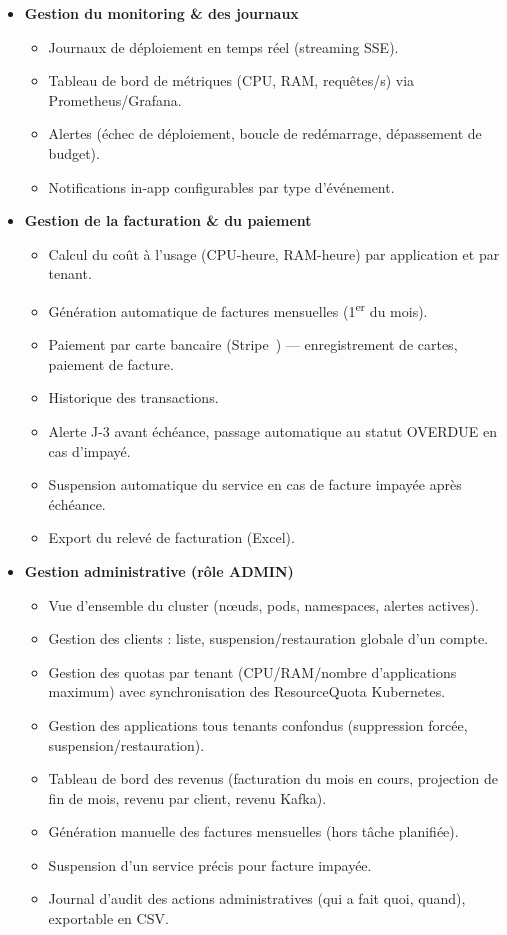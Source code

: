 \begin{itemize}
    \item \textbf{Gestion du monitoring \& des journaux}
    \begin{itemize}[label=--]
        \item Journaux de déploiement en temps réel (streaming SSE).
        \item Tableau de bord de métriques (CPU, RAM, requêtes/s) via Prometheus/Grafana.
        \item Alertes (échec de déploiement, boucle de redémarrage, dépassement de budget).
        \item Notifications in-app configurables par type d'événement.
    \end{itemize}

    \item \textbf{Gestion de la facturation \& du paiement}
    \begin{itemize}[label=--]
        \item Calcul du coût à l'usage (CPU-heure, RAM-heure) par application et par tenant.
        \item Génération automatique de factures mensuelles (1\textsuperscript{er} du mois).
        \item Paiement par carte bancaire (Stripe~\cite{StripeDoc}) — enregistrement de cartes, paiement de facture.
        \item Historique des transactions.
        \item Alerte J-3 avant échéance, passage automatique au statut OVERDUE en cas d'impayé.
        \item Suspension automatique du service en cas de facture impayée après échéance.
        \item Export du relevé de facturation (Excel).
    \end{itemize}

    \item \textbf{Gestion administrative (rôle ADMIN)}
    \begin{itemize}[label=--]
        \item Vue d'ensemble du cluster (nœuds, pods, namespaces, alertes actives).
        \item Gestion des clients : liste, suspension/restauration globale d'un compte.
        \item Gestion des quotas par tenant (CPU/RAM/nombre d'applications maximum) avec synchronisation des ResourceQuota Kubernetes.
        \item Gestion des applications tous tenants confondus (suppression forcée, suspension/restauration).
        \item Tableau de bord des revenus (facturation du mois en cours, projection de fin de mois, revenu par client, revenu Kafka).
        \item Génération manuelle des factures mensuelles (hors tâche planifiée).
        \item Suspension d'un service précis pour facture impayée.
        \item Journal d'audit des actions administratives (qui a fait quoi, quand), exportable en CSV.
    \end{itemize}
\end{itemize}

